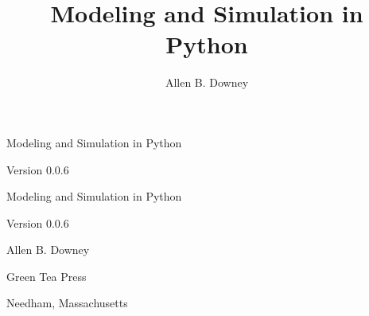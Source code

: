 \documentclass[12pt]{book}
\title{Modeling and Simulation in Python}
\author{Allen B. Downey}
\newcommand{\thetitle}{Modeling and Simulation in Python}
\newcommand{\theauthors}{Allen B. Downey}
\newcommand{\theversion}{0.0.6}
\theoremstyle{exercise}
\newif\ifplastex
\begin{document}
\frontmatter

\ifplastex

\maketitle

\else

\begin{latexonly}

\thispagestyle{empty}

\begin{flushright}
\vspace*{2.0in}

\begin{spacing}{3}
{\huge \thetitle}
\end{spacing}

\vspace{0.25in}

Version \theversion

\vfill

\end{flushright}


\newpage
\newpage

\pagebreak
\thispagestyle{empty}

\begin{flushright}
\vspace*{2.0in}

\begin{spacing}{3}
{\huge \thetitle}
\end{spacing}

\vspace{0.25in}

Version \theversion

\vspace{1in}


{\Large
\theauthors \\
}


\vspace{0.5in}

{\Large Green Tea Press}

{\small Needham, Massachusetts}

\vfill


\end{flushright}
\end{latexonly}
\end{document}
